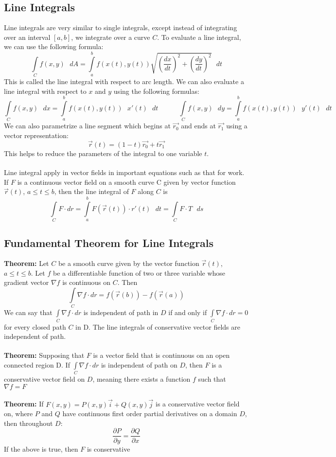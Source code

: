 \documentclass[11pt]{article}
\begin{document}
\subsection{Line Integrals}
Line integrals are very similar to single integrals, except instead of integrating over an interval $[a,b]$, we integrate over a curve $C$. To evaluate a line integral, we can use the following formula: 
$$\int\limits_{C} f(x,y)\text{ }dA = \int\limits_{a}^{b} f(x(t),y(t)) \sqrt{\left(\frac{dx}{dt}\right)^2 + \left(\frac{dy}{dt}\right)^2}\text{ } dt$$
This is called the line integral with respect to arc length. We can also evaluate a line integral with respect to $x$ and $y$ using the following formulas:
$$\int\limits_{C} f(x,y)\text{ }dx = \int\limits_{a}^{b} f(x(t),y(t))\text{ } x'(t) \text{ } dt \quad \quad \quad \int\limits_{C} f(x,y)\text{ }dy = \int\limits_{a}^{b} f(x(t),y(t)) \text{ }y'(t) \text{ } dt$$
We can also parametrize a line segment which begins at $\vec{r_0}$ and ends at $\vec{r_1}$ using a vector representation:
$$ \vec{r}(t) = (1-t)\vec{r_0} + t\vec{r_1}$$
This helps to reduce the parameters of the integral to one variable $t$.
\\ \\
Line integral apply in vector fields in important equations such as that for work. If $F$ is a continuous vector field on a smooth curve C given by vector function $\vec{r}(t)$, $a\leq t \leq b$, then the line integral of $F$ along $C$ is 
$$\int\limits_{C} F \cdot dr = \int\limits_{a}^{b} F(\vec{r}(t))\cdot r'(t) \text{ } dt = \int\limits_{C} F \cdot T \text{ }ds$$
\subsection{Fundamental Theorem for Line Integrals}
\textbf{Theorem:} Let $C$ be a smooth curve given by the vector function $\vec{r}(t)$, $a \leq t \leq b$. Let $f$ be a differentiable function of two or three variable whose gradient vector $\nabla f$ is continuous on $C$. Then
$$\int\limits_{C} \nabla f \cdot dr = f(\vec{r}(b)) - f(\vec{r}(a))$$
We can say that $\int\limits_{C} \nabla f \cdot dr$ is independent of path in $D$ if and only if $\int\limits_{C} \nabla f \cdot dr = 0$ for every closed path $C$ in D. The line integrals of conservative vector fields are independent of path.
\\ \\ 
\textbf{Theorem:} Supposing that $F$ is a vector field that is continuous on an open connected region D. If $\int\limits_{C} \nabla f \cdot dr$ is independent of path on $D$, then $F$ is a conservative vector field on $D$, meaning there exists a function $f$ such that $ \nabla f = F$
\\ \\
\textbf{Theorem:} If $F(x,y) = P(x,y)\vec{i} + Q(x,y) \vec{j}$ is a conservative vector field on, where $P$ and $Q$ have continuous first order partial derivatives on a domain $D$, then  throughout $D$:
$$ \frac{\partial P}{\partial y} = \frac{\partial Q}{\partial x}$$ 
If the above is true, then $F$ is conservative
\end{document}
